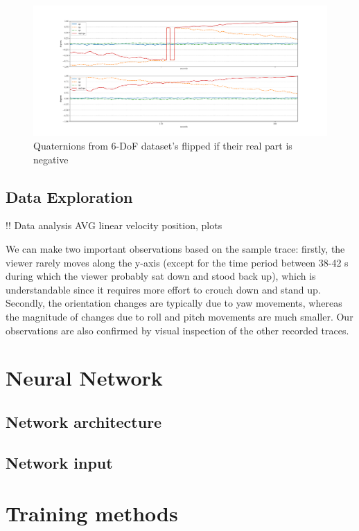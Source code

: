 \begin{figure}[htb]
	\begin{center}
		\includegraphics[width=1\textwidth, keepaspectratio]{gfx/Fig-1556-compare.pdf}
		\caption{\label{fig:compare} Quaternions from 6-DoF dataset's flipped if their real part is negative}
	\end{center}
\end{figure}



\subsection{Data Exploration}
\label{sec:design:dataset:explor}
!! Data analysis AVG linear velocity position, plots 

We can make two important observations based on the sample trace: firstly, the viewer rarely moves along the y-axis (except for the time period between 38-42 s during which the viewer probably sat down and stood back up), which is understandable since it requires more effort to crouch down and stand up. Secondly, the orientation changes are typically due to yaw movements, whereas the magnitude of changes due to roll and pitch movements are much smaller. Our observations are also confirmed by visual inspection of the other recorded traces.


\section{Neural Network}
\label{sec:design:nn}

\subsection{Network architecture}
\label{sec:design:nn:architecture}

\subsection{Network input}
\label{sec:design:nn:input}


\section{Training methods}
\label{sec:design:train}

